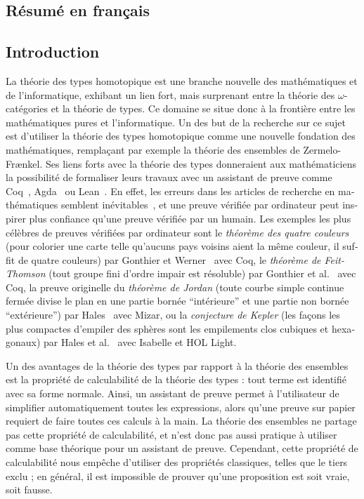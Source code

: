 \begin{otherlanguage}{french}
  
\chapter{Résumé en français}

\section{Introduction}

La théorie des types homotopique est une branche nouvelle des
mathématiques et de l'informatique, exhibant un lien fort, mais
surprenant entre la théorie des $\omega$-catégories et la théorie de
types. Ce domaine se situe donc à la frontière entre les mathématiques
pures et l'informatique. Un des but de la recherche sur ce sujet est
d'utiliser la théorie des types homotopique comme une nouvelle
fondation des mathématiques, remplaçant par exemple la théorie des
ensembles de Zermelo-Fr\ae nkel. Ses liens forts avec la théorie des
types donneraient aux mathématiciens la possibilité de formaliser
leurs travaux avec un assistant de preuve comme
Coq~\cite{coq:refman:8.4}, Agda~\cite{norell2007towards} ou
Lean~\cite{lean}. En effet, les erreurs dans les articles de recherche
en mathématiques semblent inévitables~\cite{vv-univ-f}, et une preuve
vérifiée par ordinateur peut inspirer plus confiance qu'une preuve
vérifiée par un humain. Les exemples les plus célèbres de preuves
vérifiées par ordinateur sont le {\em théorème des quatre couleurs}
(pour colorier une carte telle qu'aucuns pays voisins aient la même 
couleur, il suffit de quatre couleurs) par Gonthier et
Werner~\cite{gonthier-four-color} avec Coq, le {\em théorème de
Feit-Thomson} (tout groupe fini d'ordre impair est résoluble) par
Gonthier et al.~\cite{gonthier-feit} avec Coq, la preuve originelle du 
{\em théorème de Jordan} (toute courbe simple continue fermée divise le plan
en une partie bornée ``intérieure'' et une partie non bornée
``extérieure'') par Hales~\cite{hales-jordan} avec Mizar, ou la {\em
  conjecture de Kepler} (les façons les plus compactes d'empiler des
sphères sont les empilements clos cubiques et hexagonaux) par Hales et
al.~\cite{hales-kepler} avec Isabelle et HOL Light.

Un des avantages de la théorie des types par rapport à la théorie des
ensembles est la propriété de calculabilité de la théorie des types :
tout terme est identifié avec sa forme normale. Ainsi, un assistant de
preuve permet à l'utilisateur de simplifier automatiquement toutes les
expressions, alors qu'une preuve sur papier requiert de faire toutes
ces calculs à la main. La théorie des ensembles ne partage pas cette
propriété de calculabilité, et n'est donc pas aussi pratique à
utiliser comme base théorique pour un assistant de preuve. Cependant,
cette propriété de calculabilité nous empêche d'utiliser des
propriétés classiques, telles que le tiers exclu ; en général, il est
impossible de prouver qu'une proposition est soit vraie, soit fausse.


\end{otherlanguage}
